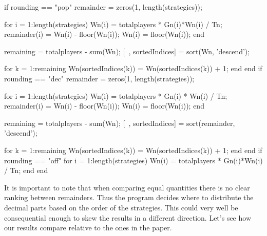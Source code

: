 \begin{}
if rounding == "pop"
    remainder = zeros(1, length(strategies));

    for i = 1:length(strategies)
        Wn(i) = totalplayers * Gn(i)*Wn(i) / Tn;
        remainder(i) = Wn(i) - floor(Wn(i));
        Wn(i) = floor(Wn(i));
    end

    remaining = totalplayers - sum(Wn);  %
    [~, sortedIndices] = sort(Wn, 'descend');  %

    for k = 1:remaining
        Wn(sortedIndices(k)) = Wn(sortedIndices(k)) + 1;
    end
end
if rounding == "dec"
    remainder = zeros(1, length(strategies));

    for i = 1:length(strategies)
        Wn(i) = totalplayers * Gn(i) * Wn(i) / Tn;
        remainder(i) = Wn(i) - floor(Wn(i));
        Wn(i) = floor(Wn(i));
    end

    remaining = totalplayers - sum(Wn);  %
    [~, sortedIndices] = sort(remainder, 'descend');  %

    for k = 1:remaining
        Wn(sortedIndices(k)) = Wn(sortedIndices(k)) + 1;
    end
end            
if rounding == "off"
    for i = 1:length(strategies)
        Wn(i) = totalplayers * Gn(i)*Wn(i) / Tn;
    end
end
\end{}
It is important to note that when comparing equal quantities there is no clear ranking between remainders. Thus the program decides where to distribute the decimal parts based on the order of the strategies. This could very well be consequential enough to skew the results in a different direction. Let's see how our results compare relative to the ones in the paper.

